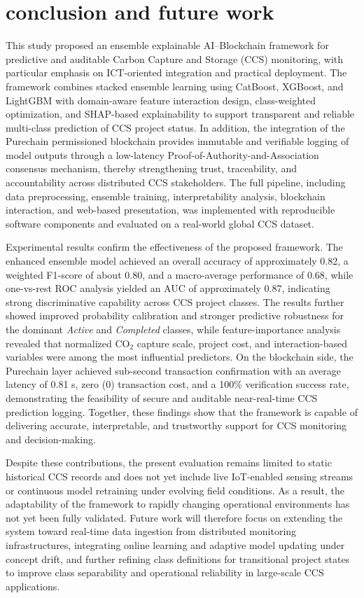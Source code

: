 \documentclass[conference]{IEEEtran}
\begin{document}
{\vspace{-0.1cm}
\section{\textbf{conclusion and future work}}
\label{con}

This study proposed an ensemble explainable AI--Blockchain framework for predictive and auditable Carbon Capture and Storage (CCS) monitoring, with particular emphasis on ICT-oriented integration and practical deployment. The framework combines stacked ensemble learning using CatBoost, XGBoost, and LightGBM with domain-aware feature interaction design, class-weighted optimization, and SHAP-based explainability to support transparent and reliable multi-class prediction of CCS project status. In addition, the integration of the Purechain permissioned blockchain provides immutable and verifiable logging of model outputs through a low-latency Proof-of-Authority-and-Association consensus mechanism, thereby strengthening trust, traceability, and accountability across distributed CCS stakeholders. The full pipeline, including data preprocessing, ensemble training, interpretability analysis, blockchain interaction, and web-based presentation, was implemented with reproducible software components and evaluated on a real-world global CCS dataset.

Experimental results confirm the effectiveness of the proposed framework. The enhanced ensemble model achieved an overall accuracy of approximately 0.82, a weighted F1-score of about 0.80, and a macro-average performance of 0.68, while one-vs-rest ROC analysis yielded an AUC of approximately 0.87, indicating strong discriminative capability across CCS project classes. The results further showed improved probability calibration and stronger predictive robustness for the dominant \textit{Active} and \textit{Completed} classes, while feature-importance analysis revealed that normalized CO$_2$ capture scale, project cost, and interaction-based variables were among the most influential predictors. On the blockchain side, the Purechain layer achieved sub-second transaction confirmation with an average latency of 0.81 s, zero (0) transaction cost, and a 100\% verification success rate, demonstrating the feasibility of secure and auditable near-real-time CCS prediction logging. Together, these findings show that the framework is capable of delivering accurate, interpretable, and trustworthy support for CCS monitoring and decision-making. 

Despite these contributions, the present evaluation remains limited to static historical CCS records and does not yet include live IoT-enabled sensing streams or continuous model retraining under evolving field conditions. As a result, the adaptability of the framework to rapidly changing operational environments has not yet been fully validated. Future work will therefore focus on extending the system toward real-time data ingestion from distributed monitoring infrastructures, integrating online learning and adaptive model updating under concept drift, and further refining class definitions for transitional project states to improve class separability and operational reliability in large-scale CCS applications.


}
\end{document}
